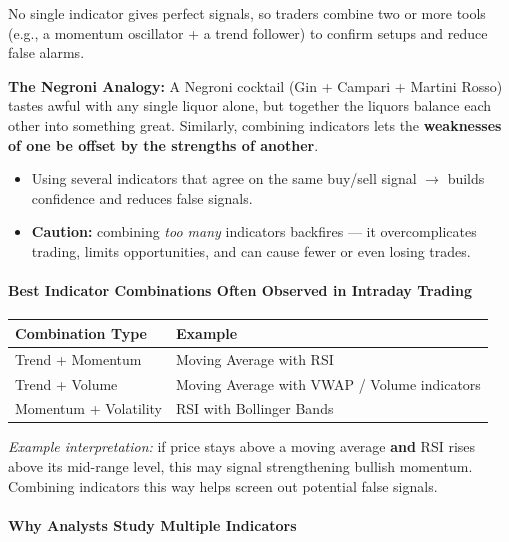 \documentclass[12pt,openany]{book}
\begin{document}
No single indicator gives perfect signals, so traders combine two or more tools (e.g., a momentum oscillator + a trend follower) to confirm setups and reduce false alarms.

\textbf{The Negroni Analogy:} A Negroni cocktail (Gin + Campari + Martini Rosso) tastes awful with any single liquor alone, but together the liquors balance each other into something great. Similarly, combining indicators lets the \textbf{weaknesses of one be offset by the strengths of another}.

\begin{itemize}[leftmargin=*]
    \item Using several indicators that agree on the same buy/sell signal \(\rightarrow\) builds confidence and reduces false signals.
    \item \textbf{Caution:} combining \emph{too many} indicators backfires --- it overcomplicates trading, limits opportunities, and can cause fewer or even losing trades.
\end{itemize}

\paragraph{Best Indicator Combinations Often Observed in Intraday Trading}

\begin{center}
\small
\renewcommand{\arraystretch}{1.2}
\begin{tabular}{|L{0.28\textwidth}|L{0.62\textwidth}|}
\hline
 \textbf{Combination Type} & \textbf{Example} \\ \hline
 Trend + Momentum & Moving Average with RSI \\ \hline
 Trend + Volume & Moving Average with VWAP / Volume indicators \\ \hline
 Momentum + Volatility & RSI with Bollinger Bands \\ \hline
\end{tabular}
\end{center}

\emph{Example interpretation:} if price stays above a moving average \textbf{and} RSI rises above its mid-range level, this may signal strengthening bullish momentum. Combining indicators this way helps screen out potential false signals.

\paragraph{Why Analysts Study Multiple Indicators}
\end{document}
